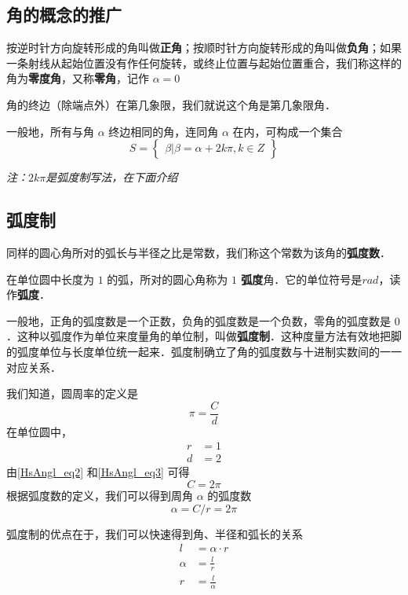 
\subsection{角的概念的推广}
按逆时针方向旋转形成的角叫做\textbf{正角}；按顺时针方向旋转形成的角叫做\textbf{负角}；如果一条射线从起始位置没有作任何旋转，或终止位置与起始位置重合，我们称这样的角为\textbf{零度角}，又称\textbf{零角}，记作 $\alpha = 0$

角的终边（除端点外）在第几象限，我们就说这个角是第几象限角．

一般地，所有与角 $\alpha$ 终边相同的角，连同角 $\alpha$ 在内，可构成一个集合
\begin{equation}
S = \begin{Bmatrix} \beta|\beta=\alpha+2k\pi,k \in Z \end{Bmatrix}
\end{equation}

\textsl{注：$2k\pi$是弧度制写法，在下面介绍}

\subsection{弧度制}
同样的圆心角所对的弧长与半径之比是常数，我们称这个常数为该角的\textbf{弧度数}．

在单位圆中长度为 $1$ 的弧，所对的圆心角称为 \textbf{$1$ 弧度}角．它的单位符号是$rad$，读作\textbf{弧度}．

一般地，正角的弧度数是一个正数，负角的弧度数是一个负数，零角的弧度数是 $0$．这种以弧度作为单位来度量角的单位制，叫做\textbf{弧度制}．这种度量方法有效地把脚的弧度单位与长度单位统一起来．弧度制确立了角的弧度数与十进制实数间的一一对应关系．

我们知道，圆周率的定义是
\begin{equation}\label{HsAngl_eq2}
\pi = \frac{C}{d}
\end{equation}
在单位圆中，
\begin{equation}\label{HsAngl_eq3}
\begin{aligned}
r &= 1\\
d &= 2
\end{aligned}
\end{equation}
由\autoref{HsAngl_eq2} 和\autoref{HsAngl_eq3} 可得
\begin{equation}
C = 2\pi
\end{equation}
根据弧度数的定义，我们可以得到周角 $\alpha$ 的弧度数
\begin{equation}
\alpha = C / r = 2\pi
\end{equation}

弧度制的优点在于，我们可以快速得到角、半径和弧长的关系
\begin{equation}
\begin{aligned}
l &= \alpha \cdot r \\
\alpha &= \frac{l}{r} \\
r &= \frac{l}{\alpha}
\end{aligned}
\end{equation}
